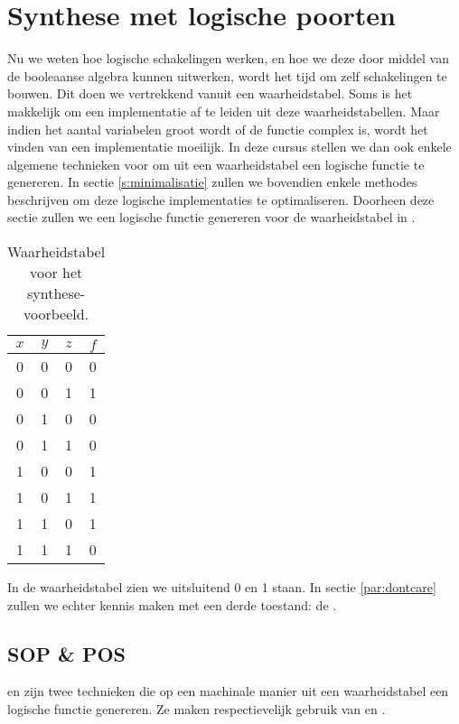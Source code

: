 \section{Synthese met logische poorten}
\label{s:synthese}
Nu we weten hoe logische schakelingen werken, en hoe we deze door middel van de booleaanse algebra kunnen uitwerken, wordt het tijd om zelf schakelingen te bouwen. Dit doen we vertrekkend vanuit een waarheidstabel. Soms is het makkelijk om een implementatie af te leiden uit deze waarheidstabellen. Maar indien het aantal variabelen groot wordt of de functie complex is, wordt het vinden van een implementatie moeilijk. In deze cursus stellen we dan ook enkele algemene technieken voor om uit een waarheidstabel een logische functie te genereren. In sectie \ref{s:minimalisatie} zullen we bovendien enkele methodes beschrijven om deze logische implementaties te optimaliseren. Doorheen deze sectie zullen we een logische functie genereren voor de waarheidstabel in .
\begin{table}[htb]
\centering
\begin{tabular}{ccc|c}
$x$&$y$&$z$&$f$\\\hline
0&0&0&0\\
0&0&1&1\\
0&1&0&0\\
0&1&1&0\\
1&0&0&1\\
1&0&1&1\\
1&1&0&1\\
1&1&1&0\\
\end{tabular}
\caption{Waarheidstabel voor het synthese-voorbeeld.}
\label{tbl:truthTableExample}
\end{table}
In de waarheidstabel zien we uitsluitend 0 en 1 staan. In sectie \ref{par:dontcare} zullen we echter kennis maken met een derde toestand: de .
\subsection{SOP \& POS}
 en  zijn twee technieken die op een machinale manier uit een waarheidstabel een logische functie genereren. Ze maken respectievelijk gebruik van  en .
